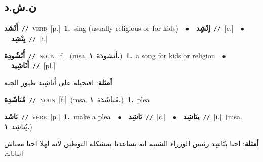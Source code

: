 \documentclass[10pt,a4paper,twoside]{article} %
\begin{document}
\begin{multicols}{2}
\vspace{-3mm}
\subsection*{\color{blue}\foreignlanguage{arabic}{ن.ش.د}\color{blue}{}} 

{\setlength\topsep{0pt}\textbf{\foreignlanguage{arabic}{أَنْشَد}}\ {\color{gray}\texttt{//}\color{black}}\ \textsc{verb}\ [p.]\ \textbf{1.}~sing (usually religious or for kids)\ \ $\bullet$\ \ \setlength\topsep{0pt}\textbf{\foreignlanguage{arabic}{اِنْشِد}}\ {\color{gray}\texttt{//}\color{black}}\ [c.]\ \ $\bullet$\ \ \setlength\topsep{0pt}\textbf{\foreignlanguage{arabic}{يِنْشِد}}\ {\color{gray}\texttt{//}\color{black}}\ [i.]\ } \vspace{2mm}

{\setlength\topsep{0pt}\textbf{\foreignlanguage{arabic}{أُنْشُودِة}}\ {\color{gray}\texttt{//}\color{black}}\ \textsc{noun}\ [f.]\ \color{gray}(msa. \foreignlanguage{arabic}{أنشودَة}~\foreignlanguage{arabic}{\textbf{١.}})\color{black}\ \textbf{1.}~a song for kids or religion\ \ $\bullet$\ \ \setlength\topsep{0pt}\textbf{\foreignlanguage{arabic}{أَنَاشِيد}}\ {\color{gray}\texttt{//}\color{black}}\ [pl.]\  \begin{flushright}\color{gray}\foreignlanguage{arabic}{\textbf{\underline{\foreignlanguage{arabic}{أمثلة}}}: افتحيله على أَناشِيد طيور الجنة}\end{flushright}\color{black}} \vspace{2mm}

{\setlength\topsep{0pt}\textbf{\foreignlanguage{arabic}{مُنَاشَدِة}}\ {\color{gray}\texttt{//}\color{black}}\ \textsc{noun}\ [f.]\ \color{gray}(msa. \foreignlanguage{arabic}{مُناشَدَة}~\foreignlanguage{arabic}{\textbf{١.}})\color{black}\ \textbf{1.}~plea\ } \vspace{2mm}

{\setlength\topsep{0pt}\textbf{\foreignlanguage{arabic}{نَاشَد}}\ {\color{gray}\texttt{//}\color{black}}\ \textsc{verb}\ [p.]\ \textbf{1.}~make a plea\ \ $\bullet$\ \ \setlength\topsep{0pt}\textbf{\foreignlanguage{arabic}{نَاشِد}}\ {\color{gray}\texttt{//}\color{black}}\ [c.]\ \ $\bullet$\ \ \setlength\topsep{0pt}\textbf{\foreignlanguage{arabic}{ينَاشِد}}\ {\color{gray}\texttt{//}\color{black}}\ [i.]\ \color{gray}(msa. \foreignlanguage{arabic}{يُناشِد}~\foreignlanguage{arabic}{\textbf{١.}})\color{black}\  \begin{flushright}\color{gray}\foreignlanguage{arabic}{\textbf{\underline{\foreignlanguage{arabic}{أمثلة}}}: احنا بنّاشِد رئيس الوزراء الشتية انه يساعدنا بمشكلة التوطين لانه لهلا احنا معناش اثباتات}\end{flushright}\color{black}} \vspace{2mm}


\end{multicols}
\end{document}
